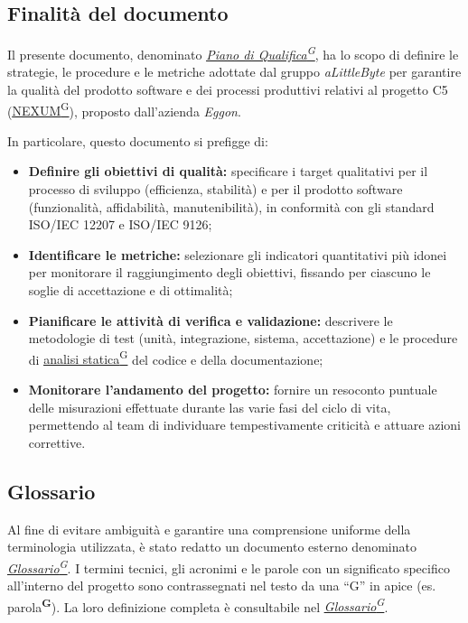 \documentclass[a4paper,12pt]{article}
\providecommand{\glslink}[2]{\href{https://alittlebyte-19.github.io/Documentazione/glossario.html\#gls-#1}{\underline{#2}\textsuperscript{\scriptsize G}}}
\begin{document}
\subsection{Finalità del documento}
Il presente documento, denominato \textit{\glslink{piano-di-qualifica}{Piano di Qualifica}}, ha lo scopo di definire le strategie, le procedure e le metriche adottate dal gruppo \textit{aLittleByte} per garantire la qualità del prodotto software e dei processi produttivi relativi al progetto C5 (\glslink{nexum}{NEXUM}), proposto dall'azienda \textit{Eggon}.

In particolare, questo documento si prefigge di:
\begin{itemize}
    \item \textbf{Definire gli obiettivi di qualità:} specificare i target qualitativi per il processo di sviluppo (efficienza, stabilità) e per il prodotto software (funzionalità, affidabilità, manutenibilità), in conformità con gli standard ISO/IEC 12207 e ISO/IEC 9126;
    \item \textbf{Identificare le metriche:} selezionare gli indicatori quantitativi più idonei per monitorare il raggiungimento degli obiettivi, fissando per ciascuno le soglie di accettazione e di ottimalità;
    \item \textbf{Pianificare le attività di verifica e validazione:} descrivere le metodologie di test (unità, integrazione, sistema, accettazione) e le procedure di \glslink{analisi-statica}{analisi statica} del codice e della documentazione;
    \item \textbf{Monitorare l'andamento del progetto:} fornire un resoconto puntuale delle misurazioni effettuate durante las varie fasi del ciclo di vita, permettendo al team di individuare tempestivamente criticità e attuare azioni correttive.
\end{itemize}

\subsection{Glossario}
Al fine di evitare ambiguità e garantire una comprensione uniforme della terminologia utilizzata, è stato redatto un documento esterno denominato \textit{\glslink{glossario}{Glossario}}.
I termini tecnici, gli acronimi e le parole con un significato specifico all'interno del progetto sono contrassegnati nel testo da una ``G'' in apice (es. parola\textsuperscript{\scriptsize\textbf{G}}). La loro definizione completa è consultabile nel \textit{\glslink{glossario}{Glossario}}.
\end{document}
